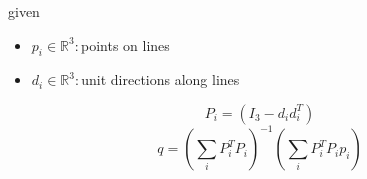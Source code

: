 \documentclass[12pt]{article}
\begin{document}
given
\begin{itemize}
\item $\textit{p}_{\textit{i}} \in \mathbb{R}^{ 3}:$points on lines
\item $\textit{d}_{\textit{i}} \in \mathbb{R}^{ 3}:$unit directions along lines
\end{itemize}

\[
\textit{P}_{ \textit{i} } = (I_{ 3 } - \textit{d}_{ \textit{i} }\textit{d}_{ \textit{i} }^T)
\]
\[
\textit{q} = (\sum_\textit{i} \textit{P}_{ \textit{i} }^T\textit{P}_{ \textit{i} })^{-1}(\sum_\textit{i} \textit{P}_{ \textit{i} }^T\textit{P}_{ \textit{i} }\textit{p}_{ \textit{i} })
\]
\end{document}
